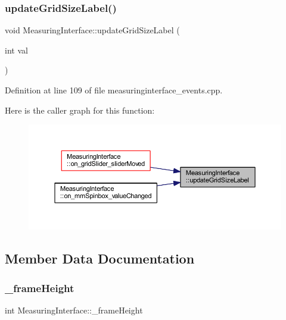 \subsubsection{\texorpdfstring{updateGridSizeLabel()}{updateGridSizeLabel()}}
{\footnotesize\ttfamily void Measuring\+Interface\+::update\+Grid\+Size\+Label (\begin{DoxyParamCaption}\item[{int}]{val }\end{DoxyParamCaption})\hspace{0.3cm}{\ttfamily [private]}}



Definition at line 109 of file measuringinterface\+\_\+events.\+cpp.

Here is the caller graph for this function\+:
\nopagebreak
\begin{figure}[H]
\begin{center}
\leavevmode
\includegraphics[width=350pt]{classMeasuringInterface_a049b5fba322e426db13761cf8d66f8a2_icgraph}
\end{center}
\end{figure}


\subsection{Member Data Documentation}
\mbox{\label{classMeasuringInterface_ad5df82a497791ea7bbf03548f389cb5b}} 
\subsubsection{\texorpdfstring{\_frameHeight}{\_frameHeight}}
{\footnotesize\ttfamily int Measuring\+Interface\+::\+\_\+frame\+Height\hspace{0.3cm}{\ttfamily [private]}}



